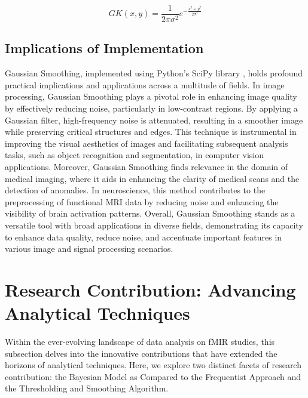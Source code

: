 \begin{equation}
GK(x,y) = \frac{1}{2\pi\sigma^2} e^{-\frac{x^2+y^2}{2\sigma^2}}
\label{eq:gaussianKernel}
\end{equation}

\subsection{Implications of Implementation}

Gaussian Smoothing, implemented using Python's SciPy library \cite{nmeth2020scipy}, holds profound practical implications and applications across a multitude of fields. In image processing, Gaussian Smoothing plays a pivotal role in enhancing image quality by effectively reducing noise, particularly in low-contrast regions. By applying a Gaussian filter, high-frequency noise is attenuated, resulting in a smoother image while preserving critical structures and edges. This technique is instrumental in improving the visual aesthetics of images and facilitating subsequent analysis tasks, such as object recognition and segmentation, in computer vision applications. Moreover, Gaussian Smoothing finds relevance in the domain of medical imaging, where it aids in enhancing the clarity of medical scans and the detection of anomalies. In neuroscience, this method contributes to the preprocessing of functional MRI data by reducing noise and enhancing the visibility of brain activation patterns. Overall, Gaussian Smoothing stands as a versatile tool with broad applications in diverse fields, demonstrating its capacity to enhance data quality, reduce noise, and accentuate important features in various image and signal processing scenarios.

\section{Research Contribution: Advancing Analytical Techniques}

Within the ever-evolving landscape of data analysis on fMIR studies, this subsection delves into the innovative contributions that have extended the horizons of analytical techniques. Here, we explore two distinct facets of research contribution: the Bayesian Model as Compared to the Frequentist Approach and the Thresholding and Smoothing Algorithm.

